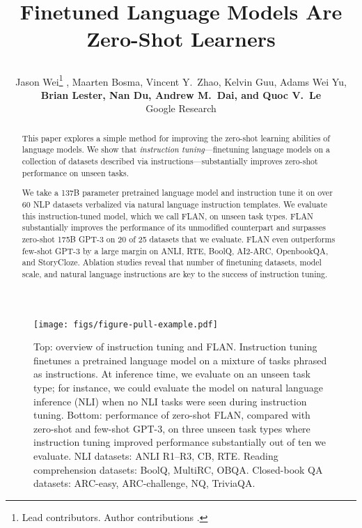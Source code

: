 \documentclass{article} \usepackage{iclr2022_conference,times}
\title{Finetuned Language Models Are Zero-Shot Learners \raggedright}
\author{\hspace{-1.7mm}
{ 
Jason Wei\thanks{Lead contributors. Author contributions \hyperref[sec:contributions]{\color{bluegray}{listed at end of paper}}.
} \hspace{0.5mm},
Maarten Bosma,
Vincent Y.~Zhao,
Kelvin Guu,
Adams Wei Yu,} \\
\textbf{Brian Lester, Nan Du, Andrew M.~Dai, and Quoc V.~Le} \vspace{1.3mm} \\
Google Research \\
}
\newcommand{\flan}{FLAN}
\begin{document}
\maketitle
\vspace{-2mm}
\begin{abstract}

This paper explores a simple method for improving the zero-shot learning abilities of language models. 
We show that \textit{instruction tuning}---finetuning language models on a collection of datasets described via instructions---substantially improves zero-shot performance on unseen tasks.\vspace{1mm}

We take a 137B parameter pretrained language model and instruction tune it on over 60 NLP datasets verbalized via natural language instruction templates.
We evaluate this instruction-tuned model, which we call \flan{}, on unseen task types.
\flan{} substantially improves the performance of its unmodified counterpart and surpasses zero-shot 175B GPT-3 on 20 of 25 datasets that we evaluate.
\flan{} even outperforms few-shot GPT-3 by a large margin on ANLI, RTE, BoolQ, AI2-ARC, OpenbookQA, and StoryCloze.
Ablation studies reveal that number of finetuning datasets, model scale, and natural language instructions are key to the success of instruction tuning.

\end{abstract}

\vspace{-3mm}
\begin{figure}[h]
    \centering
    \texttt{[image: figs/figure-pull-example.pdf]}
    \vspace{-2mm}
    \caption{
    Top: overview of instruction tuning and \flan. Instruction tuning finetunes a pretrained language model on a mixture of tasks phrased as instructions.
    At inference time, we evaluate on an unseen task type; for instance, we could evaluate the model on natural language inference (NLI) when no NLI tasks were seen during instruction tuning.
    Bottom: performance of zero-shot FLAN, compared with zero-shot and few-shot GPT-3, on three unseen task types where instruction tuning improved performance substantially out of ten we evaluate.
    NLI datasets: ANLI R1--R3, CB, RTE. Reading comprehension datasets: BoolQ, MultiRC, OBQA. Closed-book QA datasets: ARC-easy, ARC-challenge, NQ, TriviaQA.
    }
    \label{fig:flan-pull}
\end{figure}

\clearpage
\end{document}

